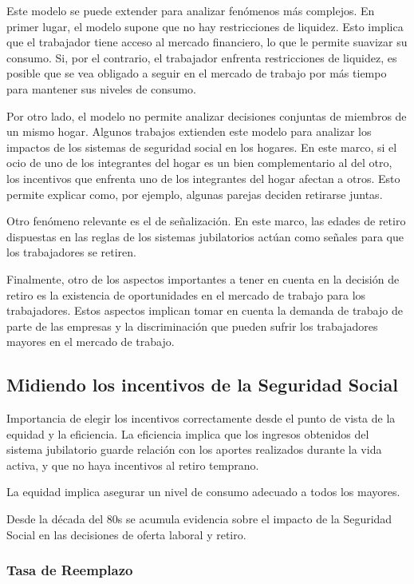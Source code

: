 \documentclass[]{article}
\begin{document}
Este modelo se puede extender para analizar fenómenos más complejos. En
primer lugar, el modelo supone que no hay restricciones de liquidez.
Esto implica que el trabajador tiene acceso al mercado financiero, lo
que le permite suavizar su consumo. Si, por el contrario, el trabajador
enfrenta restricciones de liquidez, es posible que se vea obligado a
seguir en el mercado de trabajo por más tiempo para mantener sus niveles
de consumo.

Por otro lado, el modelo no permite analizar decisiones conjuntas de
miembros de un mismo hogar. Algunos trabajos extienden este modelo para
analizar los impactos de los sistemas de seguridad social en los
hogares. En este marco, si el ocio de uno de los integrantes del hogar
es un bien complementario al del otro, los incentivos que enfrenta uno
de los integrantes del hogar afectan a otros. Esto permite explicar
como, por ejemplo, algunas parejas deciden retirarse juntas.

Otro fenómeno relevante es el de señalización. En este marco, las edades
de retiro dispuestas en las reglas de los sistemas jubilatorios actúan
como señales para que los trabajadores se retiren.

Finalmente, otro de los aspectos importantes a tener en cuenta en la
decisión de retiro es la existencia de oportunidades en el mercado de
trabajo para los trabajadores. Estos aspectos implican tomar en cuenta
la demanda de trabajo de parte de las empresas y la discriminación que
pueden sufrir los trabajadores mayores en el mercado de trabajo.

\subsection{Midiendo los incentivos de la Seguridad
Social}\label{midiendo-los-incentivos-de-la-seguridad-social}

Importancia de elegir los incentivos correctamente desde el punto de
vista de la equidad y la eficiencia. La eficiencia implica que los
ingresos obtenidos del sistema jubilatorio guarde relación con los
aportes realizados durante la vida activa, y que no haya incentivos al
retiro temprano.

La equidad implica asegurar un nivel de consumo adecuado a todos los
mayores.

Desde la década del 80s se acumula evidencia sobre el impacto de la
Seguridad Social en las decisiones de oferta laboral y retiro.

\subsubsection{Tasa de Reemplazo}\label{tasa-de-reemplazo}
\end{document}
